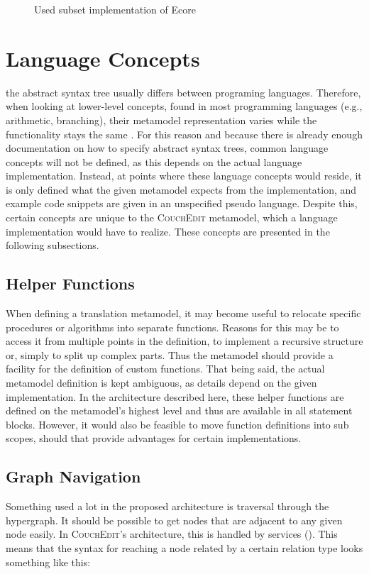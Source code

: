 \begin{figure}
  \centering
  
  \caption{Used subset implementation of Ecore}
  \label{fig:csd-abstractsyntax}
\end{figure}


\section{Language Concepts}
\label{sec:language-concepts}
the abstract syntax tree usually differs between programing languages. Therefore, when looking at lower-level concepts, found in most programming languages (e.g., arithmetic, branching), their metamodel representation varies while the functionality stays the same . For this reason and because there is already enough documentation on how to specify abstract syntax trees, common language concepts will not be defined, as this depends on the actual language implementation. Instead, at points where these language concepts would reside, it is only defined what the given metamodel expects from the implementation, and example code snippets are given in an unspecified pseudo language. Despite this, certain concepts are unique to the \textsc{CouchEdit} metamodel, which a language implementation would have to realize. These concepts are presented in the following subsections.


\subsection{Helper Functions}
When defining a translation metamodel, it may become useful to relocate specific procedures or algorithms into separate functions. Reasons for this may be to access it from multiple points in the definition, to implement a recursive structure or, simply to split up complex parts. Thus the metamodel should provide a facility for the definition of custom functions. That being said, the actual metamodel definition is kept ambiguous, as details depend on the given implementation. In the architecture described here, these helper functions are defined on the metamodel's highest level and thus are available in all statement blocks. However, it would also be feasible to move function definitions into sub scopes, should that provide advantages for certain implementations.

\subsection{Graph Navigation}
\label{sec:abstraction}
Something used a lot in the proposed architecture is traversal through the hypergraph. It should be possible to get nodes that are adjacent to any given node easily. In \textsc{CouchEdit}'s architecture, this is handled by services (). This means that the syntax for reaching a node related by a certain relation type looks something like this:

